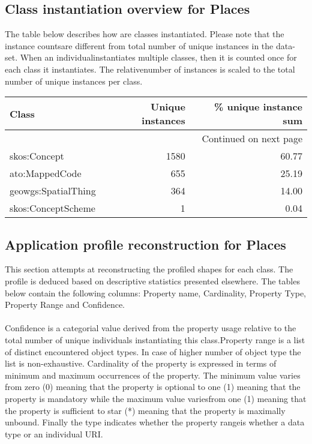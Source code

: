 \documentclass[10pt,a4paper,titlepage,final]{article}
\begin{document}
\subsection{Class instantiation overview for Places}
The table below describes how are classes instantiated. Please note that the instance countsare different from total number of unique instances in the data{-}set. When an individualinstantiates multiple classes, then it is counted once for each class it instantiates. The relativenumber of instances is scaled to the total number of unique instances per class.
\begin{longtable}{lrr}
\toprule
               Class &  Unique instances &  \% unique instance sum \\
\midrule
\endhead
\midrule
\multicolumn{3}{r}{{Continued on next page}} \\
\midrule
\endfoot

\bottomrule
\endlastfoot
        skos:Concept &              1580 &                  60.77 \\
      ato:MappedCode &               655 &                  25.19 \\
 geowgs:SpatialThing &               364 &                  14.00 \\
  skos:ConceptScheme &                 1 &                   0.04 \\
\end{longtable}


\subsection{Application profile reconstruction for Places}
This section attempts at reconstructing the profiled shapes for each class. The profile is deduced based on descriptive statistics presented elsewhere. The tables below contain the following columns: Property name, Cardinality, Property Type, Property Range and Confidence. \\\\ Confidence is a categorial value derived from the property usage relative to the total number of unique individuals instantiating this class.Property range is a list of distinct encountered object types. In case of higher number of object type the list is non{-}exhaustive. Cardinality of the property is expressed in terms of minimum and maximum occurrences of the property. The minimum value varies from zero (0) meaning that the property is optional to one (1) meaning that the property is mandatory while the maximum value variesfrom one (1) meaning that the property is sufficient to star (*) meaning that the property is maximally unbound. Finally the type indicates whether the property rangeis whether a data type or an individual URI.
\end{document}
